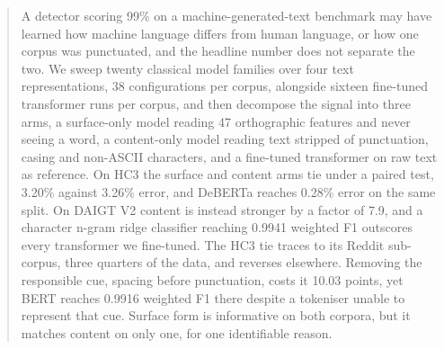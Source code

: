 \documentclass[conference,a4paper]{IEEEtran}
\begin{document}

\begin{abstract}
A detector scoring 99\% on a machine-generated-text benchmark may have learned how machine language differs from human language, or how one corpus was punctuated, and the headline number does not separate the two. We sweep twenty classical model families over four text representations, 38 configurations per corpus, alongside sixteen fine-tuned transformer runs per corpus, and then decompose the signal into three arms, a surface-only model reading 47 orthographic features and never seeing a word, a content-only model reading text stripped of punctuation, casing and non-ASCII characters, and a fine-tuned transformer on raw text as reference. On HC3 the surface and content arms tie under a paired test, 3.20\% against 3.26\% error, and DeBERTa reaches 0.28\% error on the same split. On DAIGT V2 content is instead stronger by a factor of 7.9, and a character n-gram ridge classifier reaching 0.9941 weighted F1 outscores every transformer we fine-tuned. The HC3 tie traces to its Reddit sub-corpus, three quarters of the data, and reverses elsewhere. Removing the responsible cue, spacing before punctuation, costs it 10.03 points, yet BERT reaches 0.9916 weighted F1 there despite a tokeniser unable to represent that cue. Surface form is informative on both corpora, but it matches content on only one, for one identifiable reason.
\end{abstract}
\end{document}
